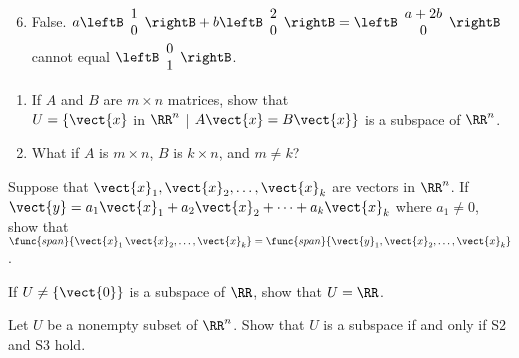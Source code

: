 \begin{multicols}{2}
\begin{ex}
\begin{sol}
\begin{enumerate}[label={\alph*.}]
\setcounter{enumi}{5}
\item  False. $a 
\leftB \begin{array}{r}
1 \\
0
\end{array} \rightB
+ b
\leftB \begin{array}{r}
2 \\
0
\end{array} \rightB
= 
\leftB \begin{array}{c}
a + 2b \\
0
\end{array} \rightB
$ cannot equal $
\leftB \begin{array}{r}
0 \\
1
\end{array} \rightB$.

\end{enumerate}
\end{sol}
\end{ex}

\begin{ex}
\begin{enumerate}[label={\alph*.}]
\item If $A$ and $B$ are $m \times n$ matrices, show that \\$U = \{\vect{x}$ in $\RR^n$ | $A\vect{x} = B\vect{x}\}$ is a subspace of $\RR^n$.

\item What if $A$ is $m \times n$, $B$ is $k \times n$, and $m \neq k$?

\end{enumerate}
\end{ex}

\begin{ex}
Suppose that $\vect{x}_{1}, \vect{x}_{2}, \dots, \vect{x}_{k}$ are vectors in $\RR^n$. If $\vect{y} = a_{1}\vect{x}_{1} + a_{2}\vect{x}_{2} + \dots + a_{k}\vect{x}_{k}$ where $a_{1} \neq 0$, show that $\func{span}\{\vect{x}_{1}\, \vect{x}_{2}, \dots, \vect{x}_{k}\} = \func{span}\{\vect{y}_{1}, \vect{x}_{2}, \dots, \vect{x}_{k}\}$.
\end{ex}

\begin{ex}
If $U \neq \{\vect{0}\}$ is a subspace of $\RR$, show that $U = \RR$.
\end{ex}

\begin{ex}\label{ex:5_1_20}
Let $U$ be a nonempty subset of $\RR^n$. Show that $U$ is a subspace if and only if S2 and S3 hold.


\end{ex}
\end{multicols}
